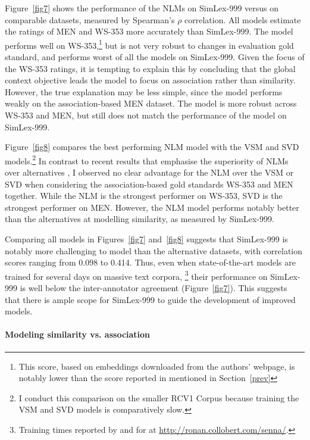 Figure~\ref{fig7} shows the performance of the NLMs on SimLex-999 versus on comparable datasets, measured by Spearman's \(\rho\) correlation. All models estimate the ratings of MEN and WS-353 more accurately than SimLex-999. The \cite{huang2012improving} model performs well on WS-353,\footnote{This score, based on embeddings downloaded from the authors' webpage, is notably lower than the score reported in \cite{huang2012improving} mentioned in Section~\ref{prev}} but is not very robust to changes in evaluation gold standard, and performs worst of all the models on SimLex-999. Given the focus of the WS-353 ratings, it is tempting to explain this by concluding that the global context objective leads the \cite{huang2012improving} model to focus on association rather than similarity. However, the true explanation may be less simple, since the \cite{huang2012improving} model performs weakly on the association-based MEN dataset. The \cite{collobert2008unified} model is more robust across WS-353 and MEN, but still does not match the performance of the \cite{mikolov2013efficient} model on SimLex-999. 

Figure~\ref{fig8} compares the best performing NLM model \cite{mikolov2013efficient} with the VSM and SVD models.\footnote{I conduct this comparison on the smaller RCV1 Corpus \cite{lewis2004rcv1} because training the VSM and SVD models is comparatively slow.}  In contrast to recent results that emphasise the superiority of NLMs over alternatives \cite{baroni2014don}, I observed no clear advantage for the NLM over the VSM or SVD when considering the association-based gold standards WS-353 and MEN together. While the NLM is the strongest performer on WS-353, SVD is the strongest performer on MEN. However, the NLM model performs notably better than the alternatives at modelling similarity, as measured by SimLex-999. 

Comparing all models in Figures~\ref{fig7} and~\ref{fig8} suggests that SimLex-999 is notably more challenging to model than the alternative datasets, with correlation scores ranging from 0.098 to 0.414. Thus, even when state-of-the-art models are trained for several days on massive text corpora, \footnote{Training times reported by \cite{huang2012improving} and for \cite{collobert2008unified} at \url{http://ronan.collobert.com/senna/}.} their performance on SimLex-999 is well below the inter-annotator agreement (Figure~\ref{fig7}). This suggests that there is ample scope for SimLex-999 to guide the development of improved models. 

\paragraph{\bf Modeling similarity vs. association}

